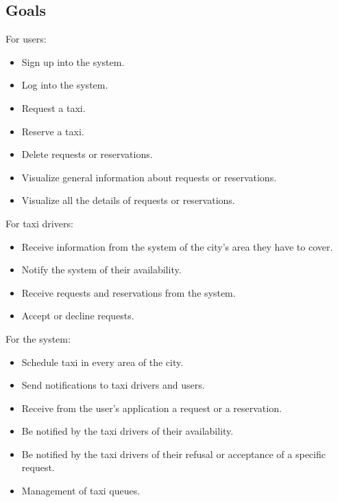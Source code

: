 \documentclass{article}
\begin{document}
	\subsection{Goals}
    	For users:
	    \begin{itemize}
    	    \item Sign up into the system.
    	    \item Log into the system.
    	    \item Request a taxi.
    	    \item Reserve a taxi.
    	    \item Delete requests or reservations.
    	    \item Visualize general information about requests or reservations.
    	    \item Visualize all the details of requests or reservations.
	    \end{itemize}
	    
	    For taxi drivers:
	    \begin{itemize}
    	    \item Receive information from the system of the city's area they have to cover.
	        \item Notify the system of their availability.
    	    \item Receive requests and reservations from the system.
    	    \item Accept or decline requests.
	    \end{itemize}
	   
	    For the system:
	    \begin{itemize}
    	    \item Schedule taxi in every area of the city.
    	    \item Send notifications to taxi drivers and users.
    	    \item Receive from the user's application a request or a reservation.
    	    \item Be notified by the taxi drivers of their availability.
    	    \item Be notified by the taxi drivers of their refusal or acceptance of a specific request.
    	    \item Management of taxi queues.
	    \end{itemize}
	    
\end{document}
